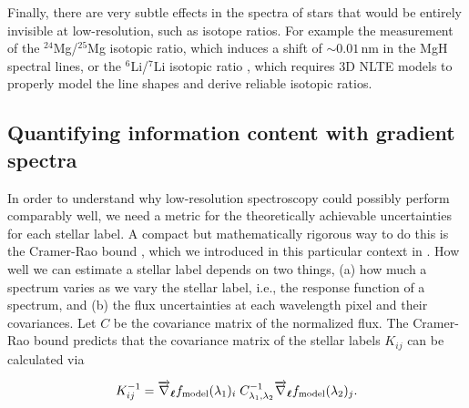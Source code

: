 \documentclass[iop]{emulateapj}
\newcommand{\set}[1]{\bm{#1}}
\newcommand{\starlabel}{\ell}
\newcommand{\labels}{\set{\starlabel}}
\begin{document}
\begin{CJK*}{UTF8}{gbsn}
Finally, there are very subtle effects in the spectra of stars that would be entirely invisible at low-resolution, such as isotope ratios. For example the measurement of the $^{24}$Mg/$^{25}$Mg isotopic ratio, which induces a shift of $\sim 0.01\,$nm in the MgH spectral lines, or the $^6$Li/$^7$Li isotopic ratio \citep{lind13}, which requires 3D NLTE models to properly model the line shapes and derive reliable isotopic ratios.


%
%
%
%
%
%

\subsection{Quantifying information content with gradient spectra}
\label{sec:gradient-spectra}

In order to understand why low-resolution spectroscopy could possibly perform comparably well, we need a metric for the theoretically achievable uncertainties for each stellar label. A compact but mathematically rigorous way to do this is the Cramer-Rao bound \citep{cra45,rao45}, which we introduced in this particular context in \citet{tin16}. How well we can estimate a stellar label depends on two things, (a) how much a spectrum varies as we vary the stellar label, i.e., the response function of a spectrum, and (b) the flux uncertainties at each wavelength pixel and their covariances. Let $C$ be the covariance matrix of the normalized flux. The Cramer-Rao bound predicts that the covariance matrix of the stellar labels $K_{ij}$ can be calculated via

\begin{equation}
K_{ij}^{-1} = \overrightarrow{\nabla}_{\labels} f_{\rm model} (\lambda_1)_{i} \; C^{-1}_{\lambda_1,\lambda_2} \overrightarrow{\nabla}_{\labels} f_{\rm model} (\lambda_2)_{j}.
\label{eq:CR-calculation}
\end{equation}


\end{CJK*}
\end{document}
